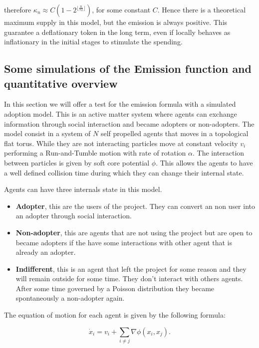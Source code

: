 \documentclass[11pt]{amsart}
\numberwithin{equation}{section}
\theoremstyle{definition}
\theoremstyle{remark}
\renewcommand{\_}[1]{_{\left( #1 \right)}}
\renewcommand{\^}[1]{^{\left( #1 \right)}}
\begin{document}
 therefore $\kappa_n \approx C (1- 2^{\lfloor \frac{n}{72}\rfloor})$, for some constant $C$. Hence there is a theoretical maximum supply in this model, but the emission is always positive. This guarantee a deflationary token in the long term, even if locally behaves as inflationary in the initial stages to stimulate the spending. 
 


\subsection{Some simulations of the Emission function and quantitative overview}


In this section we will offer a test for the emission formula with a simulated adoption model. This is an active matter system where agents can exchange information through social interaction and became adopters or non-adopters.
The model consist in a system of $N$ self propelled agents that moves in a topological flat torus.
 While they are not interacting particles move at constant velocity $v_{i}$ performing a Run-and-Tumble motion with rate of rotation $\alpha$. The interaction between particles is given by soft core potential $\phi$. This allows the agents to have a well defined collision time during which they can change their internal state. 

Agents can have three internals state in this model. 

\begin{itemize}
	\item \textbf{Adopter}, this are the users of the project. They can convert an non user into an adopter through social interaction.  
	\item \textbf{Non-adopter}, this are agents that are not using the project but are open to became adopters if the have some interactions with other agent that is already an adopter. 
	\item \textbf{Indifferent}, this is an agent that left the project for some reason and they will remain outside for some time. They don't interact with others agents. After some time governed by a Poisson distribution they became spontaneously a non-adopter again. 
\end{itemize}


The equation of motion for each agent is given by the following formula:

\begin{equation*}
\dot{x}_i = v_{i} +  \sum_{i \neq j} \nabla \phi (x_i, x_j).
\end{equation*}
\end{document}
